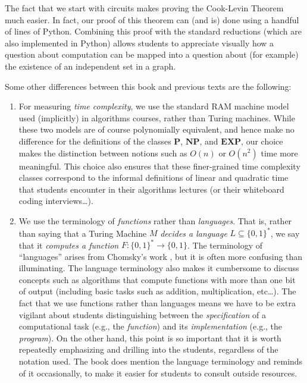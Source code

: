 The fact that we start with circuits makes proving the Cook-Levin
Theorem much easier. In fact, our proof of this theorem can (and is)
done using a handful of lines of Python. Combining this proof with the
standard reductions (which are also implemented in Python) allows
students to appreciate visually how a question about computation can be
mapped into a question about (for example) the existence of an
independent set in a graph.

Some other differences between this book and previous texts are the
following:

\begin{enumerate}
\def\labelenumi{\arabic{enumi}.}
\item
  For measuring \emph{time complexity}, we use the standard RAM machine
  model used (implicitly) in algorithms courses, rather than Turing
  machines. While these two models are of course polynomially
  equivalent, and hence make no difference for the definitions of the
  classes \(\mathbf{P}\), \(\mathbf{NP}\), and \(\mathbf{EXP}\), our
  choice makes the distinction between notions such as \(O(n)\) or
  \(O(n^2)\) time more meaningful. This choice also ensures that these
  finer-grained time complexity classes correspond to the informal
  definitions of linear and quadratic time that students encounter in
  their algorithms lectures (or their whiteboard coding
  interviews\ldots).
\item
  We use the terminology of \emph{functions} rather than
  \emph{languages}. That is, rather than saying that a Turing Machine
  \(M\) \emph{decides a language} \(L \subseteq \{0,1\}^*\), we say that
  it \emph{computes a function} \(F:\{0,1\}^* \rightarrow \{0,1\}\). The
  terminology of ``languages'' arises from Chomsky's work
  \cite{Chomsky56}, but it is often more confusing than illuminating.
  The language terminology also makes it cumbersome to discuss concepts
  such as algorithms that compute functions with more than one bit of
  output (including basic tasks such as addition, multiplication,
  etc\ldots). The fact that we use functions rather than languages means
  we have to be extra vigilant about students distinguishing between the
  \emph{specification} of a computational task (e.g., the
  \emph{function}) and its \emph{implementation} (e.g., the
  \emph{program}). On the other hand, this point is so important that it
  is worth repeatedly emphasizing and drilling into the students,
  regardless of the notation used. The book does mention the language
  terminology and reminds of it occasionally, to make it easier for
  students to consult outside resources.
\end{enumerate}

